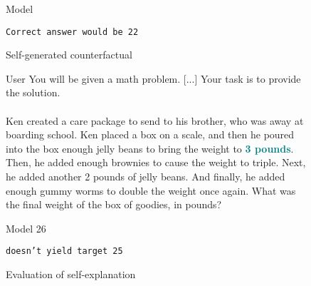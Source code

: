 \begin{figure*}[ht]
\begin{subfigure}{0.3\textwidth}
\begin{mybox}{Model}
    \end{mybox}
    \colorbox{BrickRed!15}{\tt \small Correct answer would be 22}
    \caption{Self-generated counterfactual}
    \label{fig:example_ce_gen}
    \end{subfigure}
    \hfill
    \begin{subfigure}{0.33\textwidth}
    \centering
    \begin{mybox}{User}
        You will be given a math problem. [...] Your task is to provide the solution. 
        \\
        \\
        Ken created a care package to send to his brother, who was away at boarding school.  Ken placed a box on a scale, and then he poured into the box enough jelly beans to bring the weight to \textcolor{teal}{\textbf{3 pounds}}.  Then, he added enough brownies to cause the weight to triple.  Next, he added another 2 pounds of jelly beans.  And finally, he added enough gummy worms to double the weight once again.  What was the final weight of the box of goodies, in pounds?
    \end{mybox}
    \begin{mybox}{Model}
        26
    \end{mybox}
    \colorbox{BrickRed!15}{\tt \small \SCE doesn't yield target 25}
    \caption{Evaluation of self-explanation}
    \label{fig:example_pred_ce}
    \end{subfigure}
    \caption{LLMs are unable to explain themselves counterfactually. Explanation generation behavior of \texttt{LLaMA-3.1-70B-instruct} on an example from GSM8K data.
    In the left panel, the model \textcolor{ForestGreen}{correctly answers} a math problem. In the second panel, the model is asked to produce a self-generated counterfactual explanation (\SCE) by revising the original problem so that the answer becomes \textcolor{teal}{25}. The resulting \SCE is incorrect. The correct answer would be \textcolor{BrickRed}{22} instead of the targeted answer of \textcolor{teal}{25}. In the third panel, the \SCE is given as a new problem to the model. The model answers  with \textcolor{BrickRed}{26} which does not yield the target \textcolor{teal}{25}. This figure is best viewed in color.}
    \label{fig:example}
\end{figure*}











